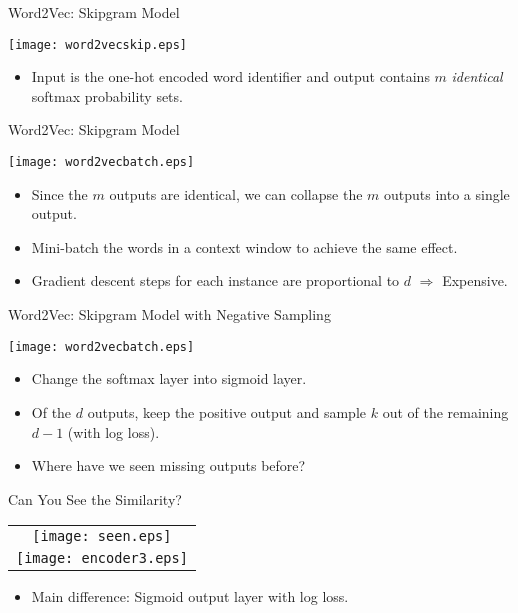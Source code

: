 \begin{frame}{Word2Vec: Skipgram Model}
\begin{center}
\texttt{[image: word2vecskip.eps]}
\end{center}
\vspace{-0.35in}
\begin{itemize}
\item Input is the one-hot encoded word identifier and output contains $m$ {\em identical} softmax probability sets.
\end{itemize}
\end{frame}


\begin{frame}{Word2Vec: Skipgram Model}
\begin{center}
\texttt{[image: word2vecbatch.eps]}
\end{center}
\begin{itemize}
\item Since the $m$ outputs are identical, we can collapse the $m$
outputs into a single output.
\item  Mini-batch the words in a context window to achieve the same
effect.
\item Gradient descent steps for each instance are proportional to
$d$ $\Rightarrow$ Expensive.
\end{itemize}
\end{frame}


\begin{frame}{Word2Vec: Skipgram Model with Negative Sampling}
\begin{center}
\texttt{[image: word2vecbatch.eps]}
\end{center}
\begin{itemize}
\item  Change the softmax layer into sigmoid layer.
\item  Of the $d$ outputs, keep the positive output and sample $k$
out of the remaining $d-1$ (with log loss).
\item Where have we seen missing outputs before?
\end{itemize}
\end{frame}


\begin{frame}{Can You See the Similarity?}
\begin{center}
\begin{tabular}{c}
\texttt{[image: seen.eps]}\\
\texttt{[image: encoder3.eps]}
\end{tabular}
\end{center}
\begin{itemize}
\item Main difference: Sigmoid output layer with log loss.
\end{itemize}
\end{frame}


